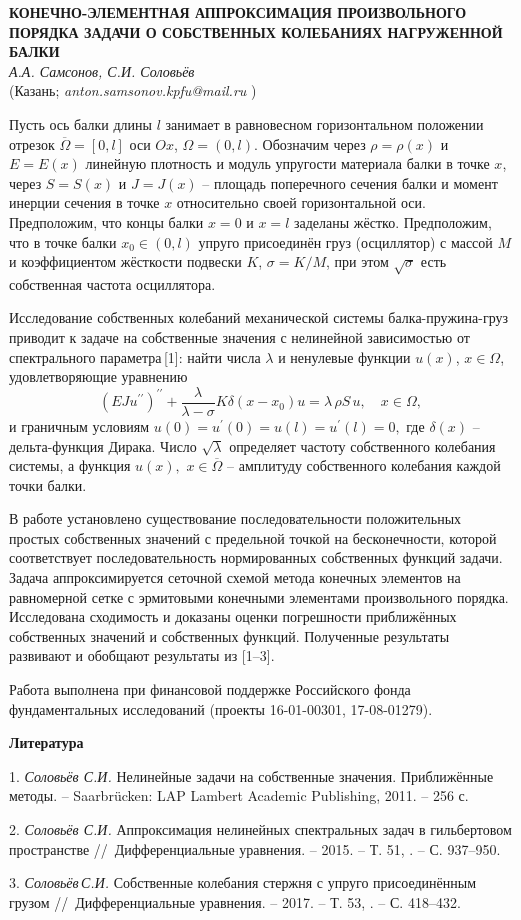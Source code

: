 \begin{center}{ \bf
КОНЕЧНО-ЭЛЕМЕНТНАЯ АППРОКСИМАЦИЯ ПРОИЗВОЛЬНОГО ПОРЯДКА ЗАДАЧИ
О СОБСТВЕННЫХ КОЛЕБАНИЯХ НАГРУЖЕННОЙ БАЛКИ}\\
{\it А.А. Самсонов, С.И. Соловьёв} \\
(Казань; {\it anton.samsonov.kpfu@mail.ru} )
\end{center}

Пусть ось балки длины $l$
занимает в равновесном горизонтальном положении отрезок $\overline{\Omega}=[0,l]$
оси $Ox$, $\Omega=(0,l)$. Обозначим через $\rho=\rho(x)$ и $E=E(x)$ линейную плотность и
модуль упругости материала балки в точке $x$,
через $S=S(x)$ и $J=J(x)$ -- площадь поперечного сечения балки и момент
инерции сечения в точке $x$ относительно своей горизонтальной оси.
Предположим, что концы балки $x=0$ и $x=l$ заделаны жёстко.
Предположим,
что в точке балки
$x_0\in(0,l)$ упруго присоединён груз (осциллятор) с массой $M$  и
коэффициентом жёсткости подвески $K$,
$\sigma=K/M$,
при этом
$\sqrt{\sigma}$ есть собственная частота осциллятора.

Исследование собственных колебаний механической системы балка-пружина-груз приводит к
задаче на собственные значения с нелинейной зависимостью от спектрального параметра\,[1]:
найти числа $\lambda$ и ненулевые функции $u(x)$, $x\in\Omega$,
удовлетворяющие уравнению
$$
(EJu^{\prime\prime})^{\prime\prime}+
\frac{\lambda}{\lambda-\sigma}
K\delta(x-x_0)u=
\lambda\,\rho S\,u,\quad
x\in\Omega,
$$
и граничным условиям
$
u(0)=u^{\prime}(0)=u(l)=u^{\prime}(l)=0,
$
где $\delta(x)$ -- дельта-функция Дирака.
Число $\sqrt{\lambda}$ определяет частоту собственного колебания системы, а функция
$u(x),$ $x\in\overline{\Omega}$ -- амплитуду собственного колебания каждой точки балки.

В работе установлено существование последовательности положительных
простых собственных значений с предельной точкой
на бесконечности, которой соответствует последовательность нормированных собственных функций задачи.
Задача аппроксимируется сеточной схемой метода конечных
элементов на равномерной сетке с эрмитовыми конечными элементами произвольного порядка.
Исследована сходимость и доказаны оценки погрешности приближённых
собственных значений и собственных функций.
Полученные результаты развивают и обобщают результаты из [1--3].

Работа выполнена при финансовой поддержке Российского фонда фундаментальных исследований
(проекты 16-01-00301, 17-08-01279).


\smallskip \centerline{\bf Литература}\nopagebreak

1. {\it Соловьёв С.И.}
Нелинейные задачи на собственные значения. Приближённые методы. --
Saarbr\"ucken: LAP Lambert Academic Publishing, 2011. -- 256 с.

2. {\it Соловьёв С.И.}
Аппроксимация нелинейных спектральных задач в гильбертовом пространстве
//~Дифференциальные уравнения. -- 2015. -- Т. 51,
. -- С. 937--950.

3. {\it Соловьёв\,С.И.}
Собственные колебания стержня с упруго присоединённым грузом
//~Дифференциальные уравнения. -- 2017. -- Т. 53,
. -- С. 418--432.


